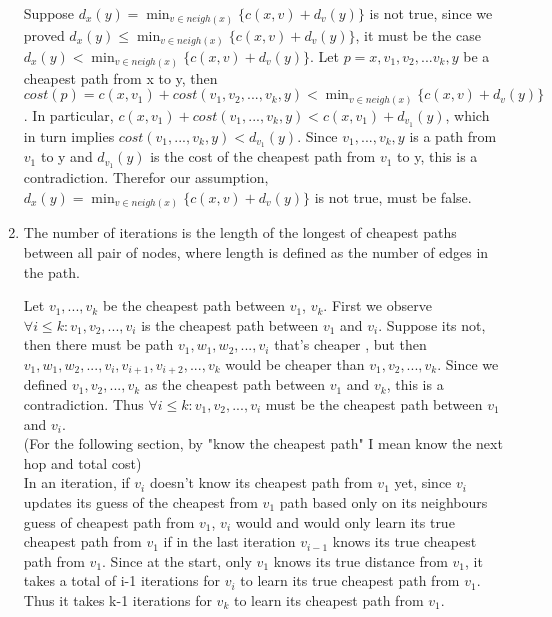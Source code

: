 \documentclass[12pt]{article}
\begin{document}
\begin{enumerate}
        Suppose $d_x(y) = \min_{v \in neigh(x)}\{c(x,v) + d_v(y)\}$ is not true, since we proved
        $d_x(y) \leq \min_{v \in neigh(x)}\{c(x,v) + d_v(y)\}$, it must be the case 
        $d_x(y) < \min_{v \in neigh(x)}\{c(x,v) + d_v(y)\}$.
        Let $p=x,v_1,v_2,...v_k,y$ be a cheapest path from x to y, then  
        $cost(p) = c(x,v_1) + cost(v_1, v_2,...,v_k,y) < \min_{v \in neigh(x)}\{c(x,v) + d_v(y)\}$. 
        In particular, $c(x, v_1) + cost(v_1,...,v_k,y) < c(x, v_1) + d_{v_1}(y)$,
        which in turn implies $cost(v_1,...,v_k,y) < d_{v_1}(y)$.
        Since $v_1,...,v_k,y$ is a path from $v_1$ to y and $d_{v_1}(y)$ is the cost of the cheapest path from 
        $v_1$ to y, this is a contradiction. Therefor our assumption, $d_x(y) = \min_{v \in neigh(x)}\{c(x,v) + d_v(y)\}$ is not true,
        must be false.

	\item %
        The number of iterations is the length of the longest of cheapest paths 
        between all pair of nodes, where length is defined as the number of edges in the path.

        Let $v_1,...,v_k$ be the cheapest path between $v_1$, $v_k$.
        First we observe $\forall i \leq k: v_1, v_2, ..., v_i$ is the cheapest path between $v_1$ and $v_i$.
        Suppose its not, then there must be path $v_1,w_1,w_2,...,v_i$ that's cheaper , but then
        $v_1,w_1,w_2,...,v_i,v_{i+1},v_{i+2},...,v_k$ would be cheaper than $v_1,v_2,...,v_k$.
        Since we defined $v_1,v_2,...,v_k$ as the cheapest path between $v_1$ and $v_k$, this is a
        contradiction. Thus $\forall i \leq k: v_1, v_2, ..., v_i$ must be the cheapest path between
        $v_1$ and $v_i$. \\

        (For the following section, by "know the cheapest path" I mean know the next hop and total cost) \\

        In an iteration, if $v_i$ doesn't know its cheapest path from $v_1$ yet, since $v_i$ updates its guess of the cheapest
        from $v_1$ path based only on its neighbours guess of cheapest path from $v_1$,
        $v_i$ would and would only learn its true cheapest path from $v_1$ if in the last 
        iteration $v_{i-1}$ knows its true cheapest path from $v_1$. Since at the start, only
        $v_1$ knows its true distance from $v_1$, it takes a total of i-1 iterations for $v_i$ to learn
        its true cheapest path from $v_1$. Thus it takes k-1 iterations for $v_k$ to learn its cheapest path
        from $v_1$. \\


\end{enumerate}
\end{document}

